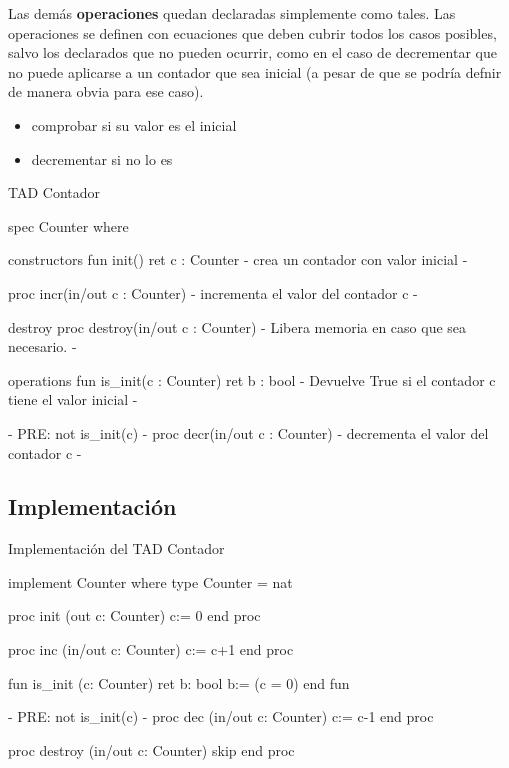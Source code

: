 Las demás \textbf{operaciones} quedan declaradas simplemente como tales. Las operaciones se definen con ecuaciones que deben cubrir todos los casos posibles, salvo los declarados que no pueden ocurrir, como en el caso de decrementar que no puede aplicarse a un contador que sea inicial (a pesar de que se podría defnir de manera obvia para ese caso). 
\begin{itemize}
    \item comprobar si su valor es el inicial
    \item decrementar si no lo es
\end{itemize}

\begin{codebox}{TAD Contador}
\begin{pascallike}
spec Counter where

constructors
    fun init() ret c : Counter
    {- crea un contador con valor inicial -}

    proc incr(in/out c : Counter)
    {- incrementa el valor del contador c -}

destroy
    proc destroy(in/out c : Counter)
    {- Libera memoria en caso que sea necesario. -}

operations
    fun is_init(c : Counter) ret b : bool
    {- Devuelve True si el contador c tiene el valor inicial -}

    {- PRE: not is_init(c) -}
    proc decr(in/out c : Counter)
    {- decrementa el valor del contador c -}
\end{pascallike}
\end{codebox}

\subsection{Implementación}

\begin{codebox}{Implementación del TAD Contador}
\begin{pascallike}
implement Counter where
type Counter = nat

proc init (out c: Counter)
    c:= 0
end proc

proc inc (in/out c: Counter)
    c:= c+1
end proc

fun is_init (c: Counter) ret b: bool
    b:= (c = 0)
end fun

{- PRE: not is_init(c) -}
proc dec (in/out c: Counter)
    c:= c-1
end proc

proc destroy (in/out c: Counter)
    skip
end proc
\end{pascallike}
\end{codebox}

